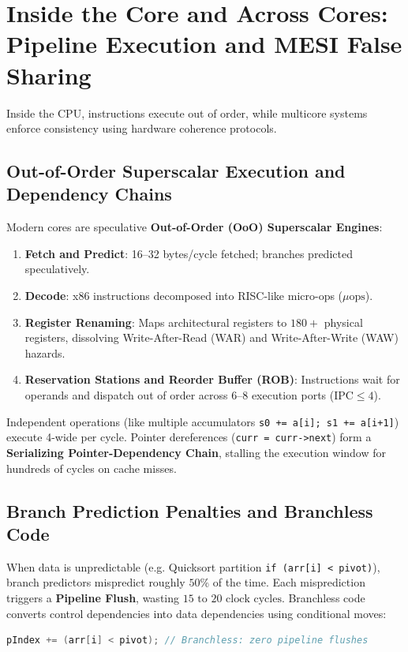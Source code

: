 \chapterline

\section{Inside the Core and Across Cores: Pipeline Execution and MESI False Sharing}

Inside the CPU, instructions execute out of order, while multicore systems enforce
consistency using hardware coherence protocols.

\subsection{Out-of-Order Superscalar Execution and Dependency Chains}

Modern cores are speculative \textbf{Out-of-Order (OoO) Superscalar Engines}:
\begin{enumerate}[itemsep=0pt]
    \item \textbf{Fetch and Predict}: 16--32 bytes/cycle fetched; branches predicted speculatively.
    \item \textbf{Decode}: x86 instructions decomposed into RISC-like micro-ops ($\mu\text{ops}$).
    \item \textbf{Register Renaming}: Maps architectural registers to $180+$ physical registers, dissolving Write-After-Read (WAR) and Write-After-Write (WAW) hazards.
    \item \textbf{Reservation Stations and Reorder Buffer (ROB)}: Instructions wait for operands and dispatch out of order across 6--8 execution ports ($\text{IPC} \le 4$).
\end{enumerate}

Independent operations (like multiple accumulators \texttt{s0 += a[i]; s1 += a[i+1]})
execute 4-wide per cycle. Pointer dereferences (\texttt{curr = curr->next}) form a
\textbf{Serializing Pointer-Dependency Chain}, stalling the execution window for hundreds
of cycles on cache misses.

\subsection{Branch Prediction Penalties and Branchless Code}

When data is unpredictable (e.g. Quicksort partition \texttt{if (arr[i] < pivot)}),
branch predictors mispredict roughly $50\%$ of the time.
Each misprediction triggers a \textbf{Pipeline Flush}, wasting $15\text{ to }20\text{ clock cycles}$.
Branchless code converts control dependencies into data dependencies using conditional moves:
\begin{lstlisting}[language=C++]
pIndex += (arr[i] < pivot); // Branchless: zero pipeline flushes
\end{lstlisting}

